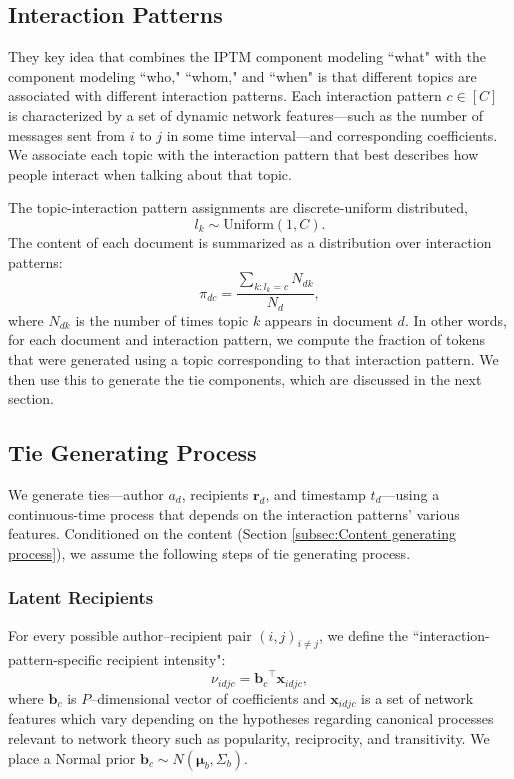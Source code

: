 \documentclass{article}
\begin{document}
\subsection{Interaction Patterns}\label{subsec:Interaction patterns}
They key idea that combines the IPTM component modeling ``what" with
the component modeling ``who," ``whom," and ``when" is that different
topics are associated with different interaction patterns.  Each interaction pattern $c \in [C]$ is characterized by a set of dynamic network features---such as the number of messages sent from $i$ to $j$ in some time interval---and corresponding coefficients. We associate each topic with the interaction pattern that best describes how people interact when talking about that topic. 

The topic-interaction pattern assignments are discrete-uniform distributed,
\begin{equation}
l_k\sim \mbox{Uniform}(1, C).
\end{equation}
The content of each document is summarized as a distribution
over interaction patterns:
\begin{equation}
\pi_{dc} = \frac{\sum_{k:l_k=c}N_{dk}}{N_d},
\end{equation}
where $N_{dk}$ is the number of times topic $k$ appears in document $d$. In other words, for each document and interaction pattern, we compute the fraction of tokens that were generated using a topic corresponding to that interaction
pattern. We then use this to generate the tie components, which are discussed in the next section.

\subsection{Tie Generating Process}\label{subsec:Tie generating process}
We generate ties---author $a_d$, recipients $\boldsymbol{r}_d$, and timestamp $t_d$---using a continuous-time process
that depends on the interaction patterns' various features. Conditioned on the content (Section \ref{subsec:Content generating process}), we assume the following steps of tie generating process.

\subsubsection{Latent Recipients}\label{subsubsec:Hypothetical Recipients}
For every possible author--recipient pair $(i,j)_{i \neq j}$, we define the ``interaction-pattern-specific recipient intensity":
\begin{equation}
\nu_{idjc} = {\boldsymbol{b}_c}^{\top}\boldsymbol{x}_{idjc},
\end{equation}
where $\boldsymbol{b}_c$ is $P$--dimensional vector of coefficients and $\boldsymbol{x}_{idjc}$ is a set of network features which vary depending on the hypotheses regarding canonical processes relevant to network theory such as popularity, reciprocity, and transitivity. We place a Normal prior $\boldsymbol{b}_c \sim N(\boldsymbol{\mu}_b,\Sigma_b)$.
\end{document}
